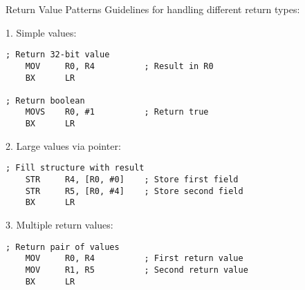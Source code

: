 \begin{KR}{Return Value Patterns}
Guidelines for handling different return types:

1. Simple values:
\begin{lstlisting}[language=armasm, style=basesmol]
; Return 32-bit value
    MOV     R0, R4          ; Result in R0
    BX      LR
    
; Return boolean
    MOVS    R0, #1          ; Return true
    BX      LR
\end{lstlisting}

2. Large values via pointer:
\begin{lstlisting}[language=armasm, style=basesmol]
; Fill structure with result
    STR     R4, [R0, #0]    ; Store first field
    STR     R5, [R0, #4]    ; Store second field
    BX      LR
\end{lstlisting}

3. Multiple return values:
\begin{lstlisting}[language=armasm, style=basesmol]
; Return pair of values
    MOV     R0, R4          ; First return value
    MOV     R1, R5          ; Second return value
    BX      LR
\end{lstlisting}
\end{KR}

